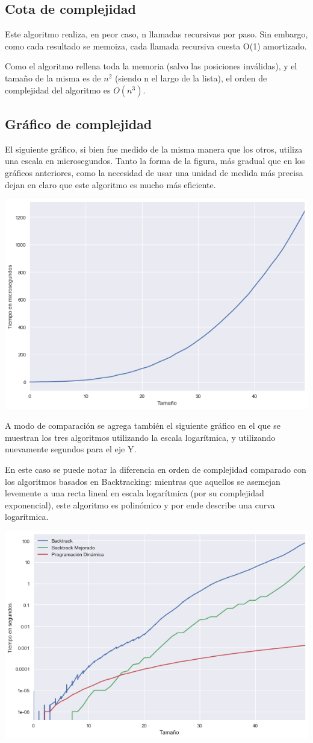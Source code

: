 	\subsection{Cota de complejidad}

	Este algoritmo realiza, en peor caso, n llamadas recursivas por paso. Sin embargo, como cada resultado se memoiza, cada llamada recursiva cuesta O(1) amortizado.

	Como el algoritmo rellena toda la memoria (salvo las posiciones inválidas), y el tamaño de la misma es de $n^2$ (siendo n el largo de la lista), el orden de complejidad del algoritmo es $O(n^3)$.

	\pagebreak
	\subsection{Gráfico de complejidad}

	El siguiente gráfico, si bien fue medido de la misma manera que los otros, utiliza una escala en microsegundos. Tanto la forma de la figura, más gradual que en los gráficos anteriores, como la necesidad de usar una unidad de medida más precisa dejan en claro que este algoritmo es mucho más eficiente.

	\begin{center}
	\includegraphics[width=.8\textwidth]{ej3.png}
	\end{center}

	A modo de comparación se agrega también el siguiente gráfico en el que se muestran los tres algoritmos utilizando la escala logarítmica, y utilizando nuevamente segundos para el eje Y.

	En este caso se puede notar la diferencia en orden de complejidad comparado con los algoritmos basados en Backtracking: mientras que aquellos se asemejan levemente a una recta lineal en escala logarítmica (por su complejidad exponencial), este algoritmo es polinómico y por ende describe una curva logarítmica.

	\begin{center}
	\includegraphics[width=.8\textwidth]{ej3-2.png}
	\end{center}